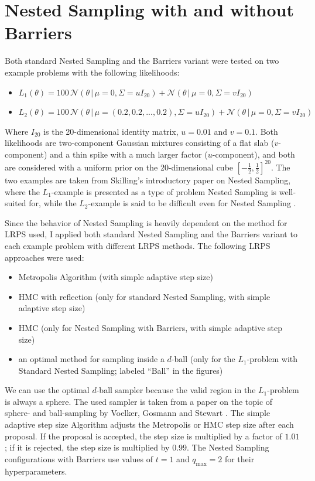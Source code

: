 \documentclass[12pt, a4paper]{report}
\begin{document}
\section{Nested Sampling with and without Barriers}
Both standard Nested Sampling and the Barriers variant were tested on two example problems with the following likelihoods:
\begin{itemize}
    \item $L_1(\theta) = 100 \, \mathcal{N}(\theta \,|\, \mu=0, \Sigma= u I_{20}) + \mathcal{N}(\theta \,|\, \mu=0, \Sigma= v I_{20})$
    \item $L_2(\theta) = 100 \, \mathcal{N}(\theta \,|\, \mu=(0.2, 0.2, ..., 0.2), \Sigma= u I_{20}) + \mathcal{N}(\theta \,|\, \mu=0, \Sigma= v I_{20})$
\end{itemize}
Where $I_{20}$ is the 20-dimensional identity matrix, $u = 0.01$ and $v = 0.1$.
Both likelihoods are two-component Gaussian mixtures consisting of a flat slab ($v$-component) and a thin spike with a much larger factor ($u$-component), and both are considered with a uniform prior on the 20-dimensional cube $[-\frac{1}{2}, \frac{1}{2}]^{20}$.
The two examples are taken from Skilling's introductory paper on Nested Sampling, where the $L_1$-example is presented as a type of problem Nested Sampling is well-suited for, while the $L_2$-example is said to be difficult even for Nested Sampling \cite[21]{skilling}.

Since the behavior of Nested Sampling is heavily dependent on the method for LRPS used, I applied both standard Nested Sampling and the Barriers variant to each example problem with different LRPS methods.
The following LRPS approaches were used:
\begin{itemize}
    \item Metropolis Algorithm (with simple adaptive step size)
    \item HMC with reflection (only for standard Nested Sampling, with simple adaptive step size)
    \item HMC (only for Nested Sampling with Barriers, with simple adaptive step size)
    \item an optimal method for sampling inside a $d$-ball (only for the $L_1$-problem with Standard Nested Sampling; labeled ``Ball'' in the figures)  
\end{itemize}
We can use the optimal $d$-ball sampler because the valid region in the $L_1$-problem is always a sphere.
The used sampler is taken from a paper on the topic of sphere- and ball-sampling by Voelker, Gosmann and Stewart \cite[2]{sphere_sampling}.
The simple adaptive step size Algorithm adjusts the Metropolis or HMC step size after each proposal.
If the proposal is accepted, the step size is multiplied by a factor of $1.01$; if it is rejected, the step size is multiplied by $0.99$.
The Nested Sampling configurations with Barriers use values of $t=1$ and $q_{\textrm{max}} = 2$ for their hyperparameters.
\end{document}
